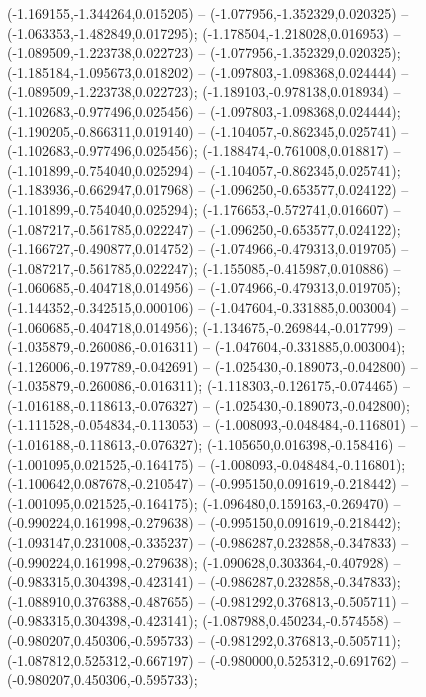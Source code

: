  (-1.169155,-1.344264,0.015205) -- (-1.077956,-1.352329,0.020325) -- (-1.063353,-1.482849,0.017295);
 (-1.178504,-1.218028,0.016953) -- (-1.089509,-1.223738,0.022723) -- (-1.077956,-1.352329,0.020325);
 (-1.185184,-1.095673,0.018202) -- (-1.097803,-1.098368,0.024444) -- (-1.089509,-1.223738,0.022723);
 (-1.189103,-0.978138,0.018934) -- (-1.102683,-0.977496,0.025456) -- (-1.097803,-1.098368,0.024444);
 (-1.190205,-0.866311,0.019140) -- (-1.104057,-0.862345,0.025741) -- (-1.102683,-0.977496,0.025456);
 (-1.188474,-0.761008,0.018817) -- (-1.101899,-0.754040,0.025294) -- (-1.104057,-0.862345,0.025741);
 (-1.183936,-0.662947,0.017968) -- (-1.096250,-0.653577,0.024122) -- (-1.101899,-0.754040,0.025294);
 (-1.176653,-0.572741,0.016607) -- (-1.087217,-0.561785,0.022247) -- (-1.096250,-0.653577,0.024122);
 (-1.166727,-0.490877,0.014752) -- (-1.074966,-0.479313,0.019705) -- (-1.087217,-0.561785,0.022247);
 (-1.155085,-0.415987,0.010886) -- (-1.060685,-0.404718,0.014956) -- (-1.074966,-0.479313,0.019705);
 (-1.144352,-0.342515,0.000106) -- (-1.047604,-0.331885,0.003004) -- (-1.060685,-0.404718,0.014956);
 (-1.134675,-0.269844,-0.017799) -- (-1.035879,-0.260086,-0.016311) -- (-1.047604,-0.331885,0.003004);
 (-1.126006,-0.197789,-0.042691) -- (-1.025430,-0.189073,-0.042800) -- (-1.035879,-0.260086,-0.016311);
 (-1.118303,-0.126175,-0.074465) -- (-1.016188,-0.118613,-0.076327) -- (-1.025430,-0.189073,-0.042800);
 (-1.111528,-0.054834,-0.113053) -- (-1.008093,-0.048484,-0.116801) -- (-1.016188,-0.118613,-0.076327);
 (-1.105650,0.016398,-0.158416) -- (-1.001095,0.021525,-0.164175) -- (-1.008093,-0.048484,-0.116801);
 (-1.100642,0.087678,-0.210547) -- (-0.995150,0.091619,-0.218442) -- (-1.001095,0.021525,-0.164175);
 (-1.096480,0.159163,-0.269470) -- (-0.990224,0.161998,-0.279638) -- (-0.995150,0.091619,-0.218442);
 (-1.093147,0.231008,-0.335237) -- (-0.986287,0.232858,-0.347833) -- (-0.990224,0.161998,-0.279638);
 (-1.090628,0.303364,-0.407928) -- (-0.983315,0.304398,-0.423141) -- (-0.986287,0.232858,-0.347833);
 (-1.088910,0.376388,-0.487655) -- (-0.981292,0.376813,-0.505711) -- (-0.983315,0.304398,-0.423141);
 (-1.087988,0.450234,-0.574558) -- (-0.980207,0.450306,-0.595733) -- (-0.981292,0.376813,-0.505711);
 (-1.087812,0.525312,-0.667197) -- (-0.980000,0.525312,-0.691762) -- (-0.980207,0.450306,-0.595733);

